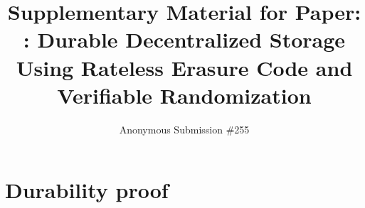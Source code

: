 \documentclass[acm,workingdraft]{paper}
\begin{document}
\title{Supplementary Material for Paper: \\ \sys: Durable Decentralized Storage Using Rateless Erasure Code and Verifiable Randomization}

\author{\small Anonymous Submission \#255}

\maketitle
\pagestyle{plain}

\section{Durability proof}


\nocite{ipfs}


\end{document}
